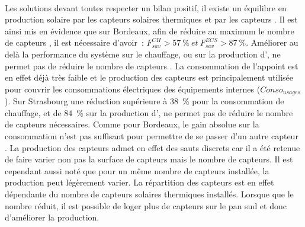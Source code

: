 \paragraph{} %
Les solutions devant toutes respecter un bilan positif, il existe un équilibre en
production solaire par les capteurs solaires thermiques et par les capteurs .
Il est ainsi mis en évidence que sur Bordeaux, afin de réduire au maximum le nombre
de capteurs , il est nécessaire d’avoir~:
$F_{sav}^{CH} > \SI{57}{\percent} \ et \ F_{sav}^{ECS} > \SI{87}{\percent}$.
Améliorer au delà la performance du système sur le chauffage, ou sur la production d’,
ne permet pas de réduire le nombre de capteurs . La consommation de l’appoint
est en effet déjà très faible et le production des capteurs  est principalement
utilisée pour couvrir les consommations électriques des équipements internes ($Conso_{usages}$).
Sur Strasbourg une réduction supérieure à \SI{38}{\percent} pour la consommation de chauffage, et de
\SI{84}{\percent} sur la production d’, ne permet pas de réduire le nombre de capteurs  nécessaires.
Comme pour Bordeaux, le gain absolue sur la consommation n’est pas suffisant pour permettre de se passer d’un
autre capteur .
La production des capteurs  admet en effet des sauts discrets car il a été retenue de faire
varier non pas la surface de capteurs mais le nombre de capteurs. Il est cependant aussi
noté que pour un même nombre de capteurs installée, la production peut légèrement varier.
La répartition des capteurs  est en effet dépendante du nombre de capteurs
solaires thermiques installés. Lorsque que le nombre réduit, il est possible de loger plus
de capteurs  sur le pan sud et donc d’améliorer la production.

